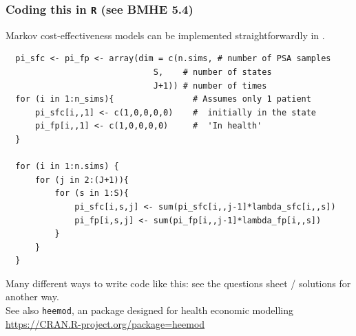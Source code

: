 \begin{frame}[fragile]
\frametitle{Coding this in \texttt{R} \small{(see BMHE 5.4)}}

Markov cost-effectiveness models can be implemented straightforwardly in \R. 

{\footnotesize \olive
\begin{verbatim}
  pi_sfc <- pi_fp <- array(dim = c(n.sims, # number of PSA samples 
                              S,    # number of states 
                              J+1)) # number of times 
  for (i in 1:n_sims){                # Assumes only 1 patient
      pi_sfc[i,,1] <- c(1,0,0,0,0)    #  initially in the state 
      pi_fp[i,,1] <- c(1,0,0,0,0)     #  'In health'
  }

  for (i in 1:n.sims) {
      for (j in 2:(J+1)){
          for (s in 1:S){
              pi_sfc[i,s,j] <- sum(pi_sfc[i,,j-1]*lambda_sfc[i,,s])
              pi_fp[i,s,j] <- sum(pi_fp[i,,j-1]*lambda_fp[i,,s])
          }
      }
  }
\end{verbatim}
  

}

Many different ways to write code like this: see the questions sheet / solutions for another way. \\

See also \texttt{heemod}, an \R package designed for health economic modelling \url{https://CRAN.R-project.org/package=heemod}

\end{frame}


